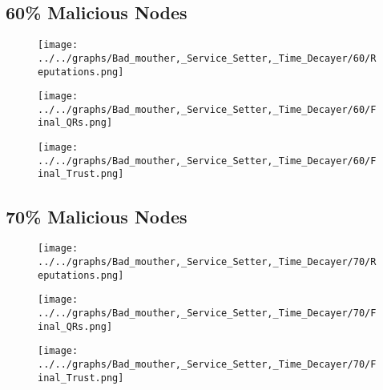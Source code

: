 \begin{minipage}[t]{0.49\columnwidth}
\subsection*{60\% Malicious Nodes}
    \begin{figure}[H]
        \centering
        \texttt{[image: ../../graphs/Bad\_mouther,\_Service\_Setter,\_Time\_Decayer/60/Reputations.png]}
    \end{figure}
    \begin{figure}[H]
        \centering
        \texttt{[image: ../../graphs/Bad\_mouther,\_Service\_Setter,\_Time\_Decayer/60/Final\_QRs.png]}
    \end{figure}
\end{minipage}
\begin{minipage}[t]{0.49\columnwidth}
    \begin{figure}[H]
        \centering
        \texttt{[image: ../../graphs/Bad\_mouther,\_Service\_Setter,\_Time\_Decayer/60/Final\_Trust.png]}
    \end{figure}
\end{minipage}

\begin{minipage}[t]{0.49\columnwidth}
\subsection*{70\% Malicious Nodes}
    \begin{figure}[H]
        \centering
        \texttt{[image: ../../graphs/Bad\_mouther,\_Service\_Setter,\_Time\_Decayer/70/Reputations.png]}
    \end{figure}
    \begin{figure}[H]
        \centering
        \texttt{[image: ../../graphs/Bad\_mouther,\_Service\_Setter,\_Time\_Decayer/70/Final\_QRs.png]}
    \end{figure}
\end{minipage}
\begin{minipage}[t]{0.49\columnwidth}
    \begin{figure}[H]
        \centering
        \texttt{[image: ../../graphs/Bad\_mouther,\_Service\_Setter,\_Time\_Decayer/70/Final\_Trust.png]}
    \end{figure}
\end{minipage}

